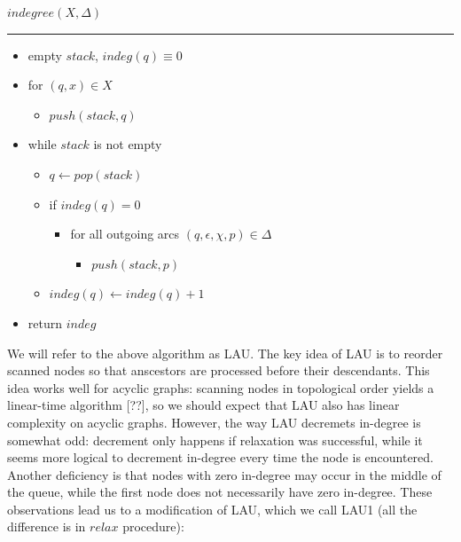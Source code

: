 \documentclass{article}
\newcommand{\Xset}{\!\leftarrow\!}
\newcommand{\Xin}{\!\in\!}
\newcommand{\Xeq}{\!=\!}
\theoremstyle{definition}
\begin{document}
\begin{multicols}{2}
    \bigskip

    $indegree(X, \Delta)$
    \hrule
    \begin{itemize}[leftmargin=0in]
        \smallskip
        \item[] empty $stack$, $indeg(q) \equiv 0$
        \item[] for $(q, x) \Xin X$
        \begin{itemize}
            \item[] $push(stack, q)$
        \end{itemize}
        \item[] while $stack$ is not empty
        \begin{itemize}
            \item[] $q \Xset pop(stack)$
            \item[] if $indeg(q) \Xeq 0$
            \begin{itemize}
                \item[] for all outgoing arcs $(q, \epsilon, \chi, p) \Xin \Delta$
                \begin{itemize}
                    \item[] $push(stack, p)$
                \end{itemize}
            \end{itemize}
            \item[] $indeg(q) \Xset indeg(q) + 1$
        \end{itemize}
        \item[] return $indeg$
    \end{itemize}

    \bigskip

We will refer to the above algorithm as LAU.
The key idea of LAU is to reorder scanned nodes so that anscestors are processed before their descendants.
This idea works well for acyclic graphs: scanning nodes in topological order yields a linear-time algorithm [??],
so we should expect that LAU also has linear complexity on acyclic graphs.
However, the way LAU decremets in-degree is somewhat odd: decrement only happens if relaxation was successful,
while it seems more logical to decrement in-degree every time the node is encountered.
Another deficiency is that nodes with zero in-degree may occur in the middle of the queue,
while the first node does not necessarily have zero in-degree.
These observations lead us to a modification of LAU, which we call LAU1
(all the difference is in $relax$ procedure):
\\


\end{multicols}
\end{document}
